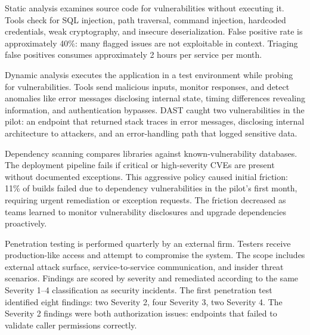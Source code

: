 Static analysis examines source code for vulnerabilities without executing it. Tools check for SQL injection, path traversal, command injection, hardcoded credentials, weak cryptography, and insecure deserialization. False positive rate is approximately 40\%: many flagged issues are not exploitable in context. Triaging false positives consumes approximately 2 hours per service per month.

Dynamic analysis executes the application in a test environment while probing for vulnerabilities. Tools send malicious inputs, monitor responses, and detect anomalies like error messages disclosing internal state, timing differences revealing information, and authentication bypasses. DAST caught two vulnerabilities in the pilot: an endpoint that returned stack traces in error messages, disclosing internal architecture to attackers, and an error-handling path that logged sensitive data.

Dependency scanning compares libraries against known-vulnerability databases. The deployment pipeline fails if critical or high-severity CVEs are present without documented exceptions. This aggressive policy caused initial friction: 11\% of builds failed due to dependency vulnerabilities in the pilot's first month, requiring urgent remediation or exception requests. The friction decreased as teams learned to monitor vulnerability disclosures and upgrade dependencies proactively.

Penetration testing is performed quarterly by an external firm. Testers receive production-like access and attempt to compromise the system. The scope includes external attack surface, service-to-service communication, and insider threat scenarios. Findings are scored by severity and remediated according to the same Severity 1--4 classification as security incidents. The first penetration test identified eight findings: two Severity 2, four Severity 3, two Severity 4. The Severity 2 findings were both authorization issues: endpoints that failed to validate caller permissions correctly.
